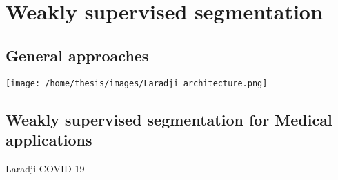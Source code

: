 
\section{Weakly supervised segmentation}

\subsection{General approaches}


\texttt{[image: /home/thesis/images/Laradji\_architecture.png]}
\label{fig:laradji}

\subsection{Weakly supervised segmentation for Medical applications}

Laradji COVID 19